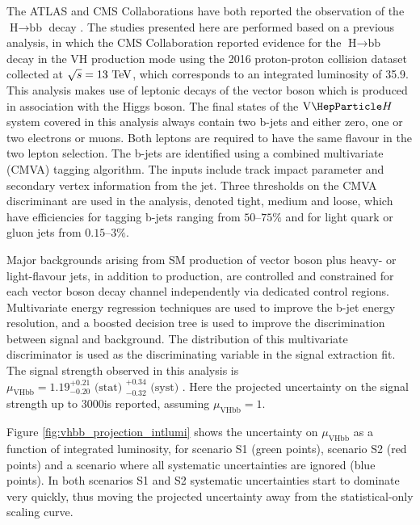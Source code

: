 The ATLAS and CMS Collaborations have both reported the observation of the $\text{H}\to\text{bb}$ decay \cite{Aaboud:2018zhk,Sirunyan:2018kst}.
The studies presented here are performed based on a previous analysis, in which 
the CMS Collaboration reported evidence for the $\text{H}\to\text{bb}$ decay in the $\text{VH}$ production mode using the 2016
proton-proton collision dataset collected at $\sqrt{s} = 13\,\,\text{Te\hspace{-.08em}V}$, which corresponds to an integrated luminosity of 35.9\fbinv \cite{HIG16044}. 
This analysis makes use of leptonic decays of the vector boson which is produced in association with the Higgs boson. The final states
of the $\vh$ system covered in this analysis always contain two b-jets and either zero, one or two electrons or muons. Both leptons are required to have the same flavour in the two lepton selection.
The b-jets are identified using a combined multivariate (CMVA) tagging algorithm. The inputs include track impact parameter and secondary vertex information from the jet. Three thresholds on the CMVA discriminant are used in the analysis, denoted tight, medium and loose, which have efficiencies for tagging b-jets ranging from $50$--$75\%$ and for light quark or gluon jets from $0.15$--$3\%$.

Major backgrounds arising from SM production of vector boson plus heavy- or light-flavour jets, in addition to \ttbar production, are 
controlled and constrained for each vector boson decay channel independently via dedicated control regions. Multivariate energy
regression techniques are used to improve the b-jet energy resolution, and a boosted decision tree is used to improve the discrimination 
between signal and background. The distribution of this multivariate discriminator is used as the discriminating
variable in the signal extraction fit. 
The signal strength observed in this analysis is 
$\mu_{\text{VHbb}} = 1.19^{+0.21}_{-0.20}\text{ (stat) }^{+0.34}_{-0.32}\text{ (syst) }$. Here the projected uncertainty
on the signal strength up to 3000\fbinv is reported, assuming $\mu_{\text{VHbb}} = 1$.

Figure \ref{fig:vhbb_projection_intlumi} shows the uncertainty on $\mu_{\text{VHbb}}$ as a function
of integrated luminosity, for scenario S1 (green points), scenario S2 (red points) and a scenario
where all systematic uncertainties are ignored (blue points).
In both scenarios
S1 and S2 systematic uncertainties start to dominate very quickly, thus moving the projected 
uncertainty away from the statistical-only scaling curve.

